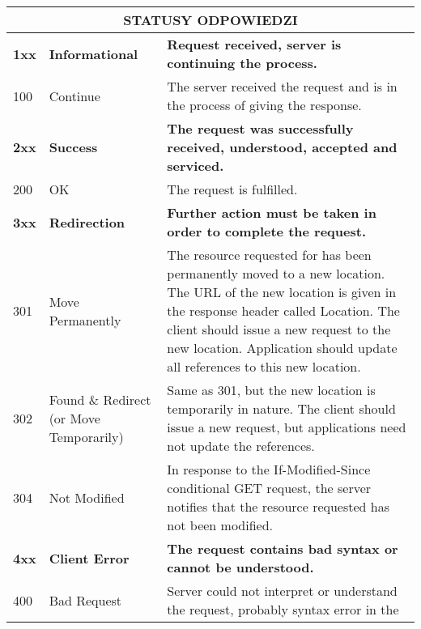 \documentclass[../main.tex]{subfiles}
\begin{document}
    \begin{table}[H]
        \begin{center}
            \begin{tabular}{|p{3cm}|p{4cm}|p{8cm}|}
                \hline
                \multicolumn{3}{|c|}{\textbf{STATUSY ODPOWIEDZI}}\\
                \hline
                \hline
                \textbf{1xx} & \textbf{Informational} & \textbf{Request received, server is continuing the process.}\\
                \hline
                100 & Continue & The server received the request and is in the process of giving the response.\\
                \hline
                \hline
                \textbf{2xx} & \textbf{Success}
                & \textbf{The request was successfully received, understood, accepted and serviced.}\\
                \hline
                200 & OK & The request is fulfilled.\\
                \hline
                \hline
                \textbf{3xx} &
                \textbf{Redirection} &
                \textbf{Further action must be taken in order to complete the request.}\\
                \hline
                301 & Move Permanently & The resource requested for has been permanently moved to a new location. The
                URL of the new location is given in the response header called Location. The client should issue a new
                request to the new location. Application should update all references to this new location.\\
                \hline
                302 & Found \& Redirect (or Move Temporarily) & Same as 301, but the new location is temporarily in
                nature. The client should issue a new request, but applications need not update the references.\\
                \hline
                304 & Not Modified& In response to the If-Modified-Since conditional GET request, the server notifies
                that the resource requested has not been modified.\\
                \hline
                \hline
                \textbf{4xx} &\textbf{Client Error} &
                \textbf{The request contains bad syntax or cannot be understood.}\\
                \hline
                400 & Bad Request & Server could not interpret or understand the request, probably syntax error in the

\end{tabular}
\end{center}
\end{table}
\end{document}
